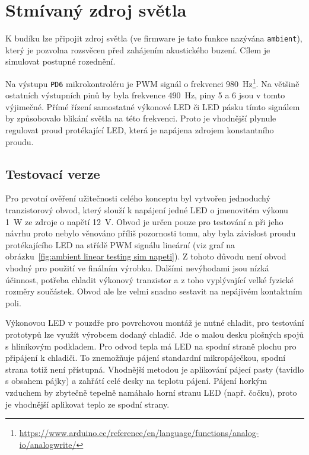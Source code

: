 \section{Stmívaný zdroj světla}
K budíku lze připojit zdroj světla (ve firmware je tato funkce nazývána
\texttt{ambient}), který je pozvolna rozsvěcen před zahájením akustického
buzení. Cílem je simulovat postupné rozednění.

Na výstupu \texttt{PD6} mikrokontroléru je PWM signál o frekvenci
\SI{980}{\hertz}\footnote{\url{https://www.arduino.cc/reference/en/language/functions/analog-io/analogwrite/}}.
Na většině ostatních výstupních pinů by byla frekvence \SI{490}{\hertz}, piny 5
a 6 jsou v tomto výjimečné. %
Přímé řízení samostatné výkonové LED či LED pásku tímto signálem by způsobovalo
blikání světla na této frekvenci. Proto je vhodnější plynule regulovat proud
protékající LED, která je napájena zdrojem konstantního proudu.


\subsection{Testovací verze}
Pro prvotní ověření užitečnosti celého konceptu byl vytvořen jednoduchý
tranzistorový obvod, který slouží k napájení jedné LED o jmenovitém výkonu
\SI{1}{\watt} ze zdroje o napětí \SI{12}{\volt}. Obvod je určen pouze pro
testování a při jeho návrhu proto nebylo věnováno příliš pozornosti tomu, aby
byla závislost proudu protékajícího LED na střídě PWM signálu lineární (viz
graf na obrázku~\vref{fig:ambient linear testing sim napeti}).
Z tohoto důvodu není obvod vhodný pro použití ve finálním výrobku. Dalšími
nevýhodami jsou nízká účinnost, potřeba chladit výkonový tranzistor a z toho
vyplývající velké fyzické rozměry součástek. Obvod ale lze velmi snadno
sestavit na nepájivém kontaktním poli.

Výkonovou LED v pouzdře pro povrchovou montáž je nutné chladit, pro testování
prototypů lze využít výrobcem dodaný chladič. Jde o malou desku plošných spojů
s hliníkovým podkladem. Pro odvod tepla má LED na spodní straně plochu pro
připájení k chladiči. To znemožňuje pájení standardní mikropáječkou, spodní
strana totiž není přístupná. Vhodnější metodou je aplikování pájecí pasty
(tavidlo s obsahem pájky) a zahřátí celé desky na teplotu pájení. Pájení horkým
vzduchem by zbytečně tepelně namáhalo horní stranu LED (např. čočku), proto je
vhodnější aplikovat teplo ze spodní strany.

